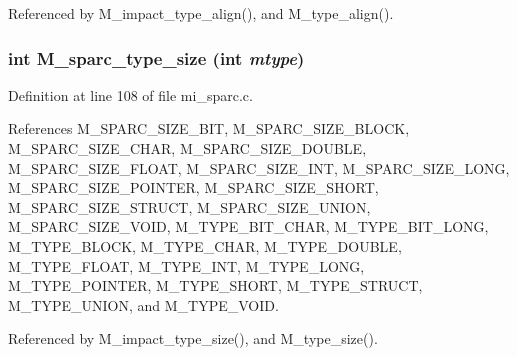 Referenced by M\_\-impact\_\-type\_\-align(), and M\_\-type\_\-align().
\subsubsection{\setlength{\rightskip}{0pt plus 5cm}int M\_\-sparc\_\-type\_\-size (int {\em mtype})}\label{mi__sparc_8c_4119eed7e591cd285d0ebb54af296dd8}




Definition at line 108 of file mi\_\-sparc.c.

References M\_\-SPARC\_\-SIZE\_\-BIT, M\_\-SPARC\_\-SIZE\_\-BLOCK, M\_\-SPARC\_\-SIZE\_\-CHAR, M\_\-SPARC\_\-SIZE\_\-DOUBLE, M\_\-SPARC\_\-SIZE\_\-FLOAT, M\_\-SPARC\_\-SIZE\_\-INT, M\_\-SPARC\_\-SIZE\_\-LONG, M\_\-SPARC\_\-SIZE\_\-POINTER, M\_\-SPARC\_\-SIZE\_\-SHORT, M\_\-SPARC\_\-SIZE\_\-STRUCT, M\_\-SPARC\_\-SIZE\_\-UNION, M\_\-SPARC\_\-SIZE\_\-VOID, M\_\-TYPE\_\-BIT\_\-CHAR, M\_\-TYPE\_\-BIT\_\-LONG, M\_\-TYPE\_\-BLOCK, M\_\-TYPE\_\-CHAR, M\_\-TYPE\_\-DOUBLE, M\_\-TYPE\_\-FLOAT, M\_\-TYPE\_\-INT, M\_\-TYPE\_\-LONG, M\_\-TYPE\_\-POINTER, M\_\-TYPE\_\-SHORT, M\_\-TYPE\_\-STRUCT, M\_\-TYPE\_\-UNION, and M\_\-TYPE\_\-VOID.

Referenced by M\_\-impact\_\-type\_\-size(), and M\_\-type\_\-size().